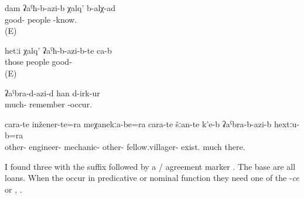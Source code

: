 \begin{exe}
	\ex
	\begin{xlist}
		\ex	\label{ex:I know good people}
		\gll	dam	ʡaˁħ-b-azi-b χalq'	b-alχ-ad \\
				good- people	-know.\\
		\glt	{} (E)

		\ex	\label{ex:Those people are good}
		\gll	hetːi χalq'	ʡaˁħ-b-azi-b-te	ca-b \\
			those	people	good-	 \\
		\glt	{} (E)

		\ex	\label{ex:I remember very much}
		\gll	ʡaˁbra-d-azi-d	han d-irk-ur \\
			much-	remember -occur. \\
		\glt	{}

		\ex	\label{ex:There are other engineers}
		\gll	cara-te	inžener-te=ra	meχanekːa-be=ra	cara-te	šːan-te	k'e-b	ʡaˁbra-b-azi-b	hextːu-b=ra \\
			other-	engineer-	mechanic-	other- 	fellow.villager-	exist.	much	there.  \\
		\glt	{}
	\end{xlist}
\end{exe}

I found three  with the suffix  followed by a / agreement marker . The base  are all loans. When the  occur in predicative or nominal function they need one of the  -\textit{ce} or  , .

